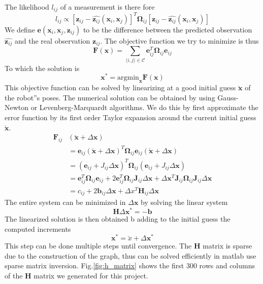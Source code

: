 \documentclass[twoside]{article}
\newcommand{\x}{\mathbf{x}}
\newcommand{\z}{\mathbf{z}}
\newcommand{\e}{\mathbf{e}}
\newcommand{\F}{\mathbf{F}}
\newcommand{\J}{\mathbf{J}}
\newcommand{\omg}{\mathbf{\Omega}}
\begin{document}
\begin{multicols}{2}
The likelihood $l_{ij}$ of a measurement is there fore
\begin{equation}
l_{ij} \propto [\z_{ij}-\hat{\z_{ij}}(\x_i,\x_j)]^T\omg_{ij}[\z_{ij}-\hat{\z_{ij}}(\x_i,\x_j)]
\end{equation}
We define $\e(\x_i, \x_j, \z_{ij})$ to be the difference between the predicted observation $\hat{\z_{ij}}$ and the real observation $\z_{ij}$. The objective function we try to minimize is thus
\begin{equation}
\F(\x)=\sum_{\langle i,j \rangle \in \mathcal{C}} \e_{ij}^T \omg_{ij} \e_{ij}
\end{equation}
To which the solution is 
\begin{equation}
\x^* = \mbox{argmin}_\x \F(\x)
\end{equation}
This objective function can be solved by linearizing at a good initial guess $\breve{\x}$ of the robot''s poses. The numerical solution can be obtained by using Gauss-Newton or Levenberg-Marquardt algorithms. We do this by first approximate the error function by its first order Taylor expansion around the current initial guess $\breve{\x}$.
\begin{align}
\F_{ij}&(\breve{\x}+\Delta\x) \\
&= \e_{ij}(\breve{\x}+\Delta	\x)^T \omg_{ij} \e_{ij}(\breve{\x}+\Delta	\x) \\
&= (\e_{ij} + J_{ij}\Delta \x)^T \omg_{ij} (\e_{ij} + J_{ij}\Delta \x) \\
&= \e_{ij}^T \omg_{ij} \e_{ij} + 2\e_{ij}^T \omg_{ij} \J_{ij} \Delta \x + \Delta	\x ^T \J_{ij}\omg_{ij}\J_{ij}\Delta \x \\
&= c_{ij} + 2\mathbf{b}_{ij}\Delta \x + \Delta x^T \mathbf{H}_{ij} \Delta \x
\end{align}
The entire system can be minimized in $\Delta \x$ by solving the linear system
\begin{equation}
\mathbf{H}\Delta \x^* = -\mathbf{b}
\end{equation}
The linearized solution is then obtained b adding to the initial guess the computed increments
\begin{equation}
\x^* = \breve{x}+\Delta \x^*
\end{equation}
This step can be done multiple steps until convergence.
The $\mathbf{H}$ matrix is sparse due to the construction of the graph, thus can be solved efficiently in matlab use sparse matrix inversion.
Fig.\ref{fig:h_matrix} shows the first 300 rows and columns of the $\mathbf{H}$ matrix we generated for this project.
\begin{figure}[H]

\end{figure}
\end{multicols}
\end{document}
